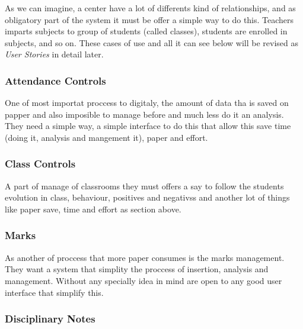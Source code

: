 \bigskip

\noindent{}

As we can imagine, a center have a lot of differents kind of relationships, and as obligatory part of the system it must be offer a simple way to do this. Teachers imparts subjects to group of students (called classes), students are enrolled in subjects, and so on. These cases of use and all it can see below will be revised as \textit{User Stories} in detail later.

\bigskip
\subsubsection{Attendance Controls}
\bigskip

One of most importat proccess to digitaly, the amount of data tha is saved on papper and also imposible to manage before and much less do it an analysis.
They need a simple way, a simple interface to do this that allow this save time (doing it, analysis and mangement it), paper and effort.


\bigskip
\subsubsection{Class Controls}
\bigskip

A part of manage of classrooms they must offers a say to follow the students evolution in class, behaviour, positives and negativss and another lot of things like paper save, time and effort as section above.

\bigskip
\subsubsection{Marks} %
\bigskip

As another of proccess that more paper consumes is the marks management. They want a system that simplity the proccess of insertion, analysis and management. Without any specially idea in mind are open to any good user interface that simplify this.


\bigskip
\subsubsection{Disciplinary Notes}
\bigskip

